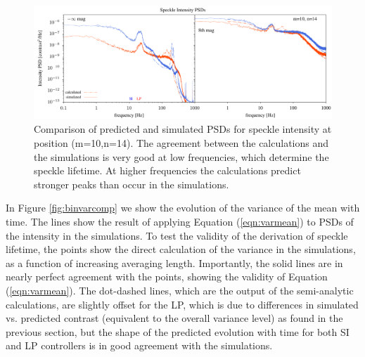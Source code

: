\documentclass[10pt,preprint]{aastex631}
\begin{document}
\begin{figure}
\hspace{-0.3in}
\includegraphics[width=6.5in]{spPsdComp_lp_10_14.pdf}
\caption{Comparison of predicted and simulated PSDs for speckle intensity at position (m=10,n=14).  The agreement between the calculations and the simulations is very good at low frequencies, which determine the speckle lifetime.  At higher frequencies the calculations predict stronger peaks than occur in the simulations.  \label{fig:sppsdcomp}}
\end{figure}

In Figure \ref{fig:binvarcomp} we show the evolution of the variance of the mean with time.  The lines show the result of applying Equation (\ref{eqn:varmean}) to PSDs of the intensity in the simulations. To test the validity of the derivation of speckle lifetime, the points show the direct calculation of the variance in the simulations, as a function of increasing averaging length.   Importantly, the solid lines are in nearly perfect agreement with the points, showing the validity of Equation (\ref{eqn:varmean}).  The dot-dashed lines, which are the output of the semi-analytic calculations, are slightly offset for the LP, which is due to differences in simulated vs. predicted contrast (equivalent to the overall variance level) as found in the previous section, but the shape of the predicted evolution with time for both SI and LP controllers is in good agreement with the simulations.
\end{document}
